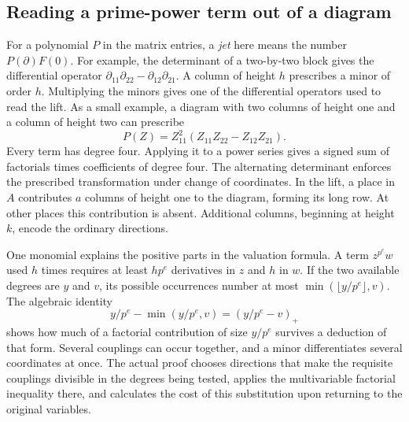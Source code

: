 \documentclass[11pt,letterpaper]{article}
\begin{document}
\subsection{Reading a prime-power term out of a diagram}

For a polynomial \(P\) in the matrix entries, a \emph{jet} here means the number \(P(\partial)F(0)\). For example, the determinant of a two-by-two block gives the differential operator \(\partial_{11}\partial_{22}-\partial_{12}\partial_{21}\). A column of height \(h\) prescribes a minor of order \(h\). Multiplying the minors gives one of the differential operators used to read the lift. As a small example, a diagram with two columns of height one and a column of height two can prescribe
\[
          P(Z)=Z_{11}^2(Z_{11}Z_{22}-Z_{12}Z_{21}).
\]
Every term has degree four. Applying it to a power series gives a signed sum of factorials times coefficients of degree four. The alternating determinant enforces the prescribed transformation under change of coordinates. In the lift, a place in \(A\) contributes \(a\) columns of height one to the diagram, forming its long row. At other places this contribution is absent. Additional columns, beginning at height \(k\), encode the ordinary directions.

One monomial explains the positive parts in the valuation formula. A term \(z^{p^e}w\) used \(h\) times requires at least \(hp^e\) derivatives in \(z\) and \(h\) in \(w\). If the two available degrees are \(y\) and \(v\), its possible occurrences number at most \(\min(\lfloor y/p^e\rfloor,v)\). The algebraic identity
\[
                 y/p^e-\min(y/p^e,v)=(y/p^e-v)_+
\]
shows how much of a factorial contribution of size \(y/p^e\) survives a deduction of that form. Several couplings can occur together, and a minor differentiates several coordinates at once. The actual proof chooses directions that make the requisite couplings divisible in the degrees being tested, applies the multivariable factorial inequality there, and calculates the cost of this substitution upon returning to the original variables.
\end{document}
